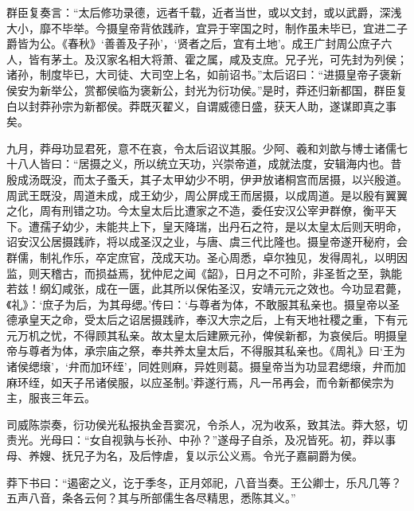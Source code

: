 \documentclass[12pt,UTF8]{ctexbook}
\begin{document}
群臣复奏言：“太后修功录德，远者千载，近者当世，或以文封，或以武爵，深浅大小，靡不毕举。今摄皇帝背依践祚，宜异于宰国之时，制作虽未毕已，宜进二子爵皆为公。《春秋》‘善善及子孙’，‘贤者之后，宜有土地’。成王广封周公庶子六人，皆有茅土。及汉家名相大将萧、霍之属，咸及支庶。兄子光，可先封为列侯；诸孙，制度毕已，大司徒、大司空上名，如前诏书。”太后诏曰：“进摄皇帝子褒新侯安为新举公，赏都侯临为褒新公，封光为衍功侯。”是时，莽还归新都国，群臣复白以封莽孙宗为新都侯。莽既灭翟义，自谓威德日盛，获天人助，遂谋即真之事矣。



九月，莽母功显君死，意不在哀，令太后诏议其服。少阿、羲和刘歆与博士诸儒七十八人皆曰：“居摄之义，所以统立天功，兴崇帝道，成就法度，安辑海内也。昔殷成汤既没，而太子蚤夭，其子太甲幼少不明，伊尹放诸桐宫而居摄，以兴殷道。周武王既没，周道未成，成王幼少，周公屏成王而居摄，以成周道。是以殷有翼翼之化，周有刑错之功。今太皇太后比遭家之不造，委任安汉公宰尹群僚，衡平天下。遭孺子幼少，未能共上下，皇天降瑞，出丹石之符，是以太皇太后则天明命，诏安汉公居摄践祚，将以成圣汉之业，与唐、虞三代比隆也。摄皇帝遂开秘府，会群儒，制礼作乐，卒定庶官，茂成天功。圣心周悉，卓尔独见，发得周礼，以明因监，则天稽古，而损益焉，犹仲尼之闻《韶》，日月之不可阶，非圣哲之至，孰能若兹！纲幻咸张，成在一匮，此其所以保佑圣汉，安靖元元之效也。今功显君薨，《礼》：‘庶子为后，为其母缌。’传曰：‘与尊者为体，不敢服其私亲也。摄皇帝以圣德承皇天之命，受太后之诏居摄践祚，奉汉大宗之后，上有天地社稷之重，下有元元万机之忧，不得顾其私亲。故太皇太后建厥元孙，俾侯新都，为哀侯后。明摄皇帝与尊者为体，承宗庙之祭，奉共养太皇太后，不得服其私亲也。《周礼》曰‘王为诸侯缌缞’，‘弁而加环绖’，同姓则麻，异姓则葛。摄皇帝当为功显君缌缞，弁而加麻环绖，如天子吊诸侯服，以应圣制。’莽遂行焉，凡一吊再会，而令新都侯宗为主，服丧三年云。



司威陈崇奏，衍功侯光私报执金吾窦况，令杀人，况为收系，致其法。莽大怒，切责光。光母曰：“女自视孰与长孙、中孙？”遂母子自杀，及况皆死。初，莽以事母、养嫂、抚兄子为名，及后悖虐，复以示公义焉。令光子嘉嗣爵为侯。



莽下书曰：“遏密之义，讫于季冬，正月郊祀，八音当奏。王公卿士，乐凡几等？五声八音，条各云何？其与所部儒生各尽精思，悉陈其义。”
\end{document}
